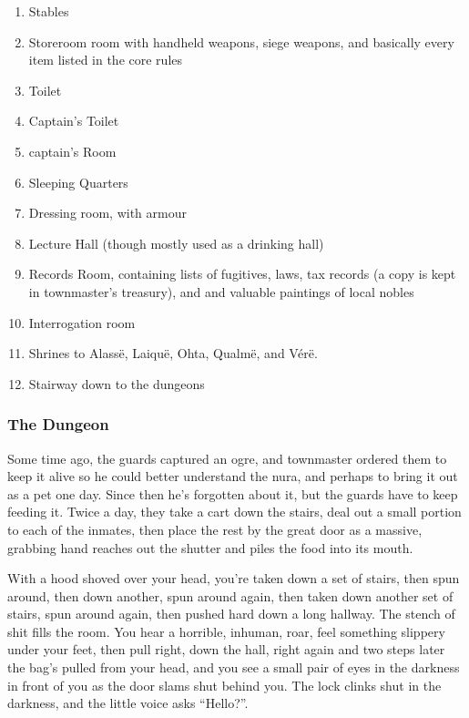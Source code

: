 \begin{multicols}{2}
\begin{enumerate}
	\item{Stables}
	\item{Storeroom room with handheld weapons, siege weapons, and basically every item listed in the core rules}
	\item{Toilet}
	\item{Captain's Toilet}
	\item{\gls{captain}'s Room}
	\item{Sleeping Quarters}
	\item{Dressing room, with armour}
	\item{Lecture Hall (though mostly used as a drinking hall)}
	\item{Records Room, containing lists of fugitives, laws, tax records (a copy is kept in \gls{townmaster}'s treasury), and and valuable paintings of local nobles}
	\item{Interrogation room}
	\item{Shrines to Alass\"{e}, Laiqu\"{e}, Ohta, Qualm\"{e}, and V\'{e}r\"{e}.}
	\item{Stairway down to the dungeons}
\end{enumerate}


\subsubsection{The Dungeon}

Some time ago, the guards captured an ogre, and \gls{townmaster} ordered them to keep it alive so he could better understand the nura, and perhaps to bring it out as a pet one day.  Since then he's forgotten about it, but the guards have to keep feeding it.  Twice a day, they take a cart down the stairs, deal out a small portion to each of the inmates, then place the rest by the great door as a massive, grabbing hand reaches out the shutter and piles the food into its mouth.

\begin{boxtext}

	With a hood shoved over your head, you're taken down a set of stairs, then spun around, then down another, spun around again, then taken down another set of stairs, spun around again, then pushed hard down a long hallway.
	 The stench of shit fills the room.
	 You hear a horrible, inhuman, roar, feel something slippery under your feet, then pull right, down the hall, right again and two steps later the bag's pulled from your head, and you see a small pair of eyes in the darkness in front of you as the door slams shut behind you.
	 The lock clinks shut in the darkness, and the little voice asks ``Hello?''.


\end{boxtext}
\end{multicols}
